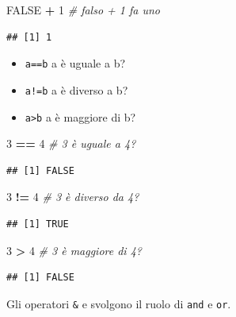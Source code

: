 \documentclass[
  11pt,
]{book}
\newenvironment{Shaded}{\begin{snugshade}}{\end{snugshade}}
\newcommand{\CommentTok}[1]{\textcolor[rgb]{0.56,0.35,0.01}{\textit{#1}}}
\newcommand{\ConstantTok}[1]{\textcolor[rgb]{0.56,0.35,0.01}{#1}}
\newcommand{\DecValTok}[1]{\textcolor[rgb]{0.00,0.00,0.81}{#1}}
\newcommand{\SpecialCharTok}[1]{\textcolor[rgb]{0.81,0.36,0.00}{\textbf{#1}}}
\providecommand{\tightlist}{%
  \setlength{\itemsep}{0pt}\setlength{\parskip}{0pt}}
\theoremstyle{mytheoremstyle}
\theoremstyle{mydefstyle}
\begin{document}
\begin{Shaded}
\begin{Highlighting}[]
\ConstantTok{FALSE} \SpecialCharTok{+} \DecValTok{1} \CommentTok{\# falso + 1 fa uno}
\end{Highlighting}
\end{Shaded}

\begin{verbatim}
## [1] 1
\end{verbatim}

\begin{itemize}
\tightlist
\item
  \texttt{a==b} a è uguale a b?
\item
  \texttt{a!=b} a è diverso a b?
\item
  \texttt{a\textgreater{}b} a è maggiore di b?
\end{itemize}

\begin{Shaded}
\begin{Highlighting}[]
\DecValTok{3} \SpecialCharTok{==} \DecValTok{4}   \CommentTok{\# 3 è uguale a 4?}
\end{Highlighting}
\end{Shaded}

\begin{verbatim}
## [1] FALSE
\end{verbatim}

\begin{Shaded}
\begin{Highlighting}[]
\DecValTok{3} \SpecialCharTok{!=} \DecValTok{4}   \CommentTok{\# 3 è diverso da 4?}
\end{Highlighting}
\end{Shaded}

\begin{verbatim}
## [1] TRUE
\end{verbatim}

\begin{Shaded}
\begin{Highlighting}[]
\DecValTok{3} \SpecialCharTok{\textgreater{}}  \DecValTok{4}   \CommentTok{\# 3 è maggiore di 4?}
\end{Highlighting}
\end{Shaded}

\begin{verbatim}
## [1] FALSE
\end{verbatim}

Gli operatori \texttt{\&} e \texttt{\textbar{}} svolgono il ruolo di \texttt{and} e \texttt{or}.
\end{document}
